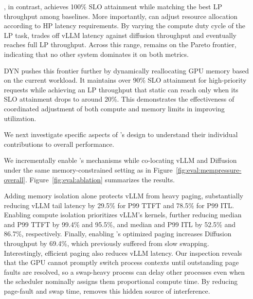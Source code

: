 \tool, in contrast, achieves 100\% SLO attainment while matching the best LP throughput among baselines.
More importantly, \tool can adjust resource allocation according to HP latency requirements.
By varying the compute duty cycle of the LP task, \tool trades off vLLM latency against diffusion throughput and eventually reaches full LP throughput.
Across this range, \tool remains on the Pareto frontier, indicating that no other system dominates it on both metrics.

\tool{}DYN pushes this frontier further by dynamically reallocating GPU memory based on the current workload. It maintains over 90\% SLO attainment for high-priority requests while achieving an LP throughput that static \tool can reach only when its SLO attainment drops to around 20\%.
This demonstrates the effectiveness of coordinated adjustment of both compute and memory limits in improving utilization.



\label{sec:eval:ablation}

We next investigate specific aspects of \tool's design to understand their individual contributions to overall performance.

We incrementally enable \tool's mechanisms while co-locating vLLM and Diffusion under the same memory-constrained setting as in Figure~\ref{fig:eval:mempressure-overall}.
Figure~\ref{fig:eval:ablation} summarizes the results.

Adding memory isolation alone protects vLLM from heavy paging, substantially reducing vLLM tail latency by 29.5\% for P99 TTFT and 78.5\% for P99 ITL. 
Enabling compute isolation prioritizes vLLM's kernels, further reducing median and P99 TTFT by 99.4\% and 95.5\%, and median and P99 ITL by 52.5\% and 86.7\%, respectively.
Finally, enabling \tool's optimized paging increases Diffusion throughput by 69.4\%, which previously suffered from slow swapping. 
Interestingly, efficient paging also reduces vLLM latency. Our inspection reveals that the GPU cannot promptly switch process contexts until outstanding page faults are resolved, so a swap-heavy process can delay other processes even when the scheduler nominally assigns them proportional compute time. By reducing page-fault and swap time, \tool removes this hidden source of interference.

